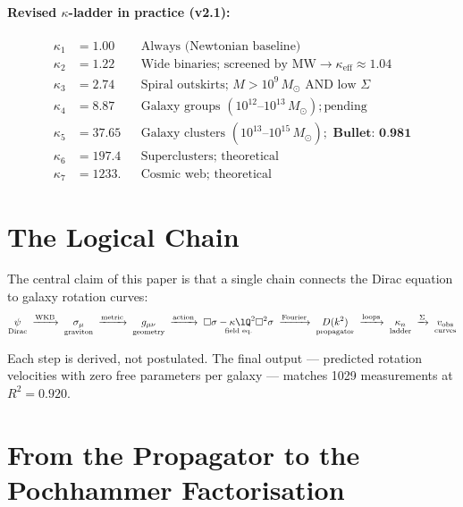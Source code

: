 \paragraph{Revised $\kappa$-ladder in practice (v2.1):}
\begin{align*}
	\kappa_1 &= 1.00  && \text{Always (Newtonian baseline)} \\
	\kappa_2 &= 1.22  && \text{Wide binaries; screened by MW} \to \kappa_\text{eff} \approx 1.04 \\
	\kappa_3 &= 2.74  && \text{Spiral outskirts; } M > 10^9\,M_\odot \text{ AND low }\Sigma \\
	\kappa_4 &= 8.87  && \text{Galaxy groups } (10^{12}\text{--}10^{13}\,M_\odot); \text{pending} \\
	\kappa_5 &= 37.65 && \text{Galaxy clusters } (10^{13}\text{--}10^{15}\,M_\odot);
	                      \textbf{ Bullet: 0.981} \\
	\kappa_6 &= 197.4 && \text{Superclusters; theoretical} \\
	\kappa_7 &= 1233. && \text{Cosmic web; theoretical}
\end{align*}

\section{The Logical Chain}

The central claim of this paper is that a single chain connects the Dirac equation to galaxy rotation curves:
\begin{equation}
  \underset{\text{Dirac}}{\psi}
  \;\xrightarrow{\text{WKB}}\;
  \underset{\text{graviton}}{\sigma_\mu}
  \;\xrightarrow{\text{metric}}\;
  \underset{\text{geometry}}{g_{\mu\nu}}
  \;\xrightarrow{\text{action}}\;
  \underset{\text{field eq.}}{\Box\sigma - \kappa\lQ^2\Box^2\sigma}
  \;\xrightarrow{\text{Fourier}}\;
  \underset{\text{propagator}}{D(k^2)}
  \;\xrightarrow{\text{loops}}\;
  \underset{\text{ladder}}{\kappa_n}
  \;\xrightarrow{\Sigma}\;
  \underset{\text{curves}}{v_{\mathrm{obs}}}
\end{equation}

Each step is derived, not postulated.  The final output --- predicted rotation velocities with zero free parameters per galaxy --- matches 1029 measurements at $R^2 = 0.920$.

\section{From the Propagator to the Pochhammer Factorisation}

